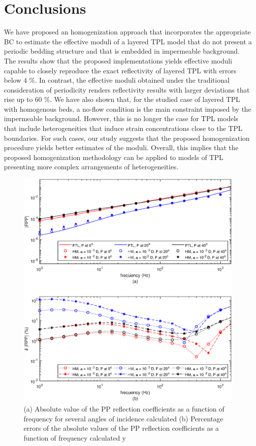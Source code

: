 \documentclass[draft]{agujournal2019}
\begin{document}
\section{Conclusions}
We have proposed an homogenization approach that incorporates the appropriate BC to estimate the effective moduli of a layered TPL model that do not present a periodic bedding structure and that is embedded in impermeable background.  The results show that the proposed implementations yields effective moduli capable to closely reproduce the exact reflectivity of layered TPL with errors below 4 \%. In contrast, the effective moduli obtained under the traditional consideration of periodicity renders reflectivity results with larger deviations that rise up to 60 \%. We  have also shown  that, for the studied case of layered TPL with homogenous beds, a no-flow condition is the main constraint imposed  by the impermeable background. However, this is no longer the case for TPL models that include heterogeneities that induce strain concentrations close to the TPL boundaries. For such cases, our study suggests that the proposed homogenization procedure yields better estimates of the moduli. Overall, this implies that the proposed homogenization methodology can be applied to models of TPL presenting more complex arrangements of heterogeneities.

\begin{figure}[!ht]
\centering
        \includegraphics[width= 120mm, height=120mm]{rppkbg_2sandshale.eps}
\caption{ (a) Absolute value of the PP reflection coefficients as a function of frequency for several angles of incidence calculated   (b) Percentage errors of the absolute values of the PP reflection coefficients as a function of frequency calculated y}
\label{fig.3}
\end{figure}
\end{document}
